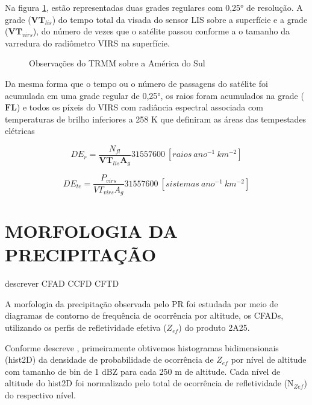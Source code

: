 Na figura \ref{gridVT},  estão representadas duas grades regulares com 0,25° de resolução. A grade ($\mathbf{VT}_{lis}$) do tempo total da visada do sensor LIS sobre a superfície e a grade ($\mathbf{VT}_{virs}$), do número de vezes que o satélite passou conforme a o tamanho da varredura do radiômetro VIRS na superfície.  

\begin{figure}[hbp]
   
\caption{Observações do TRMM sobre a América do Sul}
\label{gridVT} 

\end{figure} 

Da mesma forma que o tempo ou o número de passagens do satélite foi acumulada em uma grade regular de 0,25°, os raios foram acumulados na grade ($\mathbf{FL}$) e todos os píxeis do VIRS com radiância espectral associada com temperaturas de brilho inferiores a 258 K que definiram as áreas das tempestades elétricas  



\begin{equation}
DE_{r} = \frac{N_{fl}}{\mathbf{VT}_{lis} \mathbf{A}_g} 31557600 ~[raios~ano^{-1}~km^{-2}]    
\end{equation}

\begin{equation}
DE_{te} = \frac{P_{virs}}{VT_{virs} A_g} 31557600 ~[sistemas~ano^{-1}~km^{-2}]    
\end{equation}


\section{MORFOLOGIA DA PRECIPITAÇÃO}

descrever CFAD CCFD CFTD

A morfologia da precipitação observada pelo PR foi estudada por meio de diagramas de contorno de frequência de ocorrência por altitude, os CFADs, utilizando os perfis de refletividade efetiva ($Z_{ef}$) do produto 2A25.

Conforme descreve \cite{yuter1995}, primeiramente obtivemos histogramas bidimensionais (hist2D) da densidade de probabilidade de ocorrência de $Z_{ef}$ por nível de altitude com tamanho de bin de 1 dBZ para cada 250 m de altitude. Cada nível de altitude do hist2D foi normalizado pelo total de ocorrência de refletividade (N$_{Zef}$) do respectivo nível.

